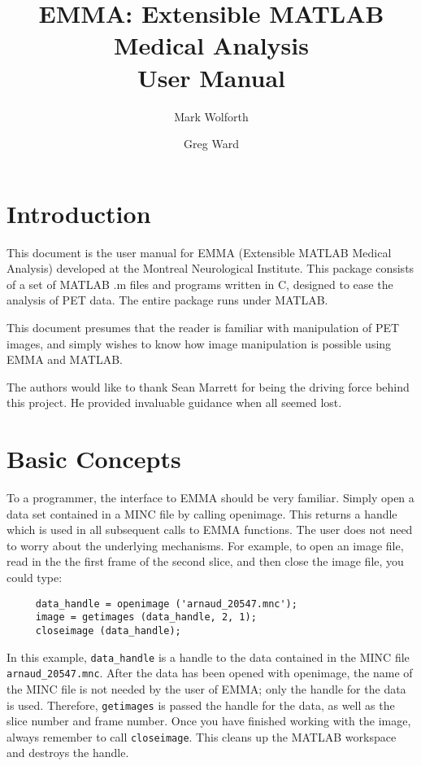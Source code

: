 
\title{EMMA: Extensible MATLAB Medical Analysis \\ User Manual}

\author{Mark Wolforth \and Greg Ward}

\def\code#1{{\tt #1}}

 

\maketitle
\newpage

\tableofcontents

\newpage
\section{Introduction}

This document is the user manual for EMMA (Extensible MATLAB Medical
Analysis) developed at the Montreal Neurological Institute.  This
package consists of a set of MATLAB .m files and programs written in
C, designed to ease the analysis of PET data.  The entire package runs
under MATLAB.

This document presumes that the reader is familiar with manipulation
of PET images, and simply wishes to know how image manipulation is
possible using EMMA and MATLAB.

The authors would like to thank Sean Marrett for being the driving
force behind this project.  He provided invaluable guidance when all
seemed lost.

\newpage
\section{Basic Concepts}
\label{basic_concepts}

To a programmer, the interface to EMMA should be very familiar.
Simply open a data set contained in a MINC file by calling openimage.
This returns a handle which is used in all subsequent calls to EMMA
functions.  The user does not need to worry about the underlying
mechanisms.  For example, to open an image file, read in the the first
frame of the second slice, and then close the image file, you could
type:
%
\begin{verbatim}
     data_handle = openimage ('arnaud_20547.mnc');
     image = getimages (data_handle, 2, 1); 
     closeimage (data_handle);
\end{verbatim}
%
In this example, \verb+data_handle+ is a handle to the data contained
in the MINC file \verb+arnaud_20547.mnc+.  After the data has been
opened with openimage, the name of the MINC file is not needed by the
user of EMMA; only the handle for the data is used.  Therefore,
\verb+getimages+ is passed the handle for the data, as well as the
slice number and frame number.  Once you have finished working with
the image, always remember to call \verb+closeimage+.  This cleans up
the MATLAB workspace and destroys the handle.

